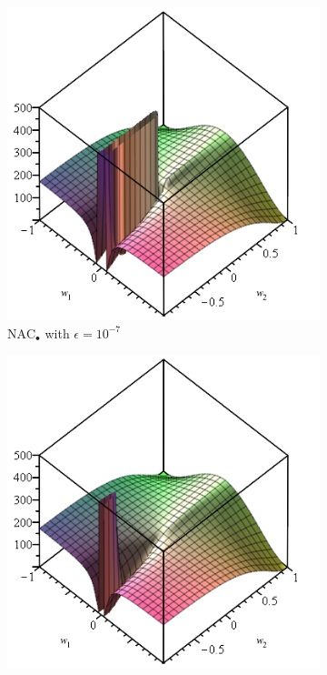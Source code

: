 \begin{figure}[h]
\centering
\begin{subfigure}{.33\textwidth}
  \centering
  \includegraphics[width=\linewidth]{graphics/nac-mul-eps-1em7.png}
  \caption{$\mathrm{NAC}_{\bullet}$ with $\epsilon = 10^{-7}$}
\end{subfigure}%
\begin{subfigure}{.33\textwidth}
  \centering
  \includegraphics[width=\linewidth]{graphics/nac-mul-eps-1em1.png}

\end{subfigure}
\end{figure}

